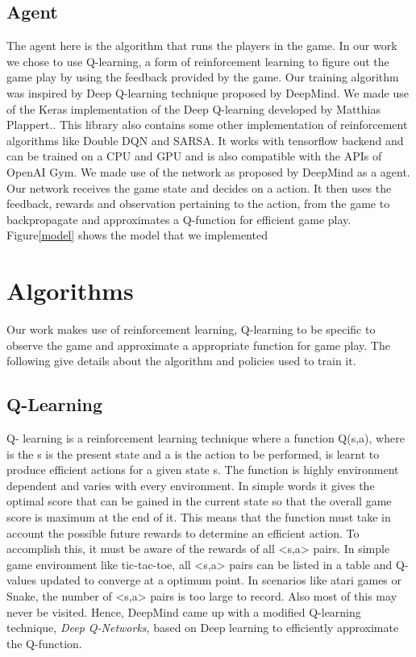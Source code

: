 \documentclass[conference,10pt]{IEEEtran}
\begin{document}
	
	\subsection{Agent}
	The agent here is the algorithm that runs the players in the game. In our work we chose to use Q-learning, a form of reinforcement learning to figure out the game play by using the feedback provided by the game. Our training algorithm was inspired by Deep Q-learning technique proposed by DeepMind\cite{n4}.
	\break
	\break
	We made use of the Keras implementation of the Deep Q-learning developed by Matthias Plappert.\cite{n5}. This library also contains some other implementation of reinforcement algorithms like Double DQN and SARSA. It works with tensorflow backend and can be trained on a CPU and GPU and is also compatible with the APIs of OpenAI Gym.
	\break
	\break
	We made use of the network as proposed by DeepMind as a agent. Our network receives the game state and decides on a action. It then uses the feedback, rewards and observation pertaining to the action, from the game to backpropagate and approximates a Q-function for efficient game play.
	Figure\ref{model} shows the model that we implemented
	
	\section{Algorithms}
	Our work makes use of reinforcement learning, Q-learning to be specific to observe the game and approximate a appropriate function for game play. The following give details about the algorithm and policies used to train it.
	
	\subsection{Q-Learning}
	Q- learning is a reinforcement learning technique where a function Q(s,a), where is the s is the present state and a is the action to be performed, is learnt to produce efficient actions for a given state s. The function is highly environment dependent and varies with every environment. In simple words it gives the optimal score that can be gained in the current state so that the overall game score is maximum at the end of it. This means that the function must take in account the possible future rewards to determine an efficient action. To accomplish this, it must be aware of the rewards of all <s,a> pairs. In simple game environment like tic-tac-toe, all <s,a> pairs can be listed in a table and Q-values updated to converge at a optimum point. In scenarios like atari games or Snake, the number of <s,a> pairs is too large to record. Also most of this may never be visited. Hence, DeepMind came up with a modified Q-learning technique, \textit{Deep Q-Networks}, based on Deep learning to efficiently approximate the Q-function.
	
\end{document}
